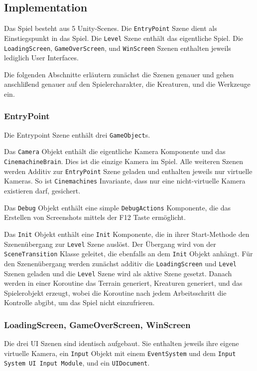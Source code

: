  
\subsection{Implementation}
\begin{sloppypar}
Das Spiel besteht aus 5 Unity-Scenes.
Die \texttt{Entry\-Point} Szene dient als Einstiegspunkt in das Spiel.
Die \texttt{Level} Szene enthält das eigentliche Spiel.
Die \texttt{Loading\-Screen}, \texttt{GameOver\-Screen}, und \texttt{Win\-Screen} Szenen enthalten jeweils lediglich User Interfaces.

Die folgenden Abschnitte erläutern zunächst die Szenen genauer und gehen anschlißend genauer auf den Spielercharakter, die Kreaturen, und die Werkzeuge ein.
\end{sloppypar}

\subsubsection{EntryPoint}
\begin{sloppypar}
Die Entrypoint Szene enthält drei \texttt{Game\-Object}s.

Das \texttt{Camera} Objekt enthält die eigentliche Kamera Komponente und das \texttt{Cinemachine\-Brain}.
Dies ist die einzige Kamera im Spiel.
Alle weiteren Szenen werden Additiv zur \texttt{Entry\-Point} Szene geladen und enthalten jeweils nur virtuelle Kameras.
So ist \texttt{Cinemachines} Invariante, dass nur eine nicht-virtuelle Kamera existieren darf, gesichert.

Das \texttt{Debug} Objekt enthält eine simple \texttt{Debug\-Actions} Komponente, die das Erstellen von Screenshots mittels der F12 Taste ermöglicht.

Das \texttt{Init} Objekt enthält eine \texttt{Init} Komponente, die in ihrer Start-Methode den Szenenübergang zur \texttt{Level} Szene auslöst.
Der Übergang wird von der \texttt{Scene\-Transition} Klasse geleitet, die ebenfalls an dem \texttt{Init} Objekt anhängt.
Für den Szenenübergang werden zunächst additiv die \texttt{Loading\-Screen} und \texttt{Level} Szenen geladen und die \texttt{Level} Szene wird als aktive Szene gesetzt.
Danach werden in einer Koroutine das Terrain generiert, Kreaturen generiert, und das Spielerobjekt erzeugt, wobei die Koroutine nach jedem Arbeitsschritt die Kontrolle abgibt, um das Spiel nicht einzufrieren.
\end{sloppypar}

\subsubsection{LoadingScreen, GameOverScreen, WinScreen}
Die drei UI Szenen sind identisch aufgebaut.
Sie enthalten jeweils ihre eigene virtuelle Kamera, ein \texttt{Input} Objekt mit einem \texttt{EventSystem} und dem \texttt{Input System UI Input Module}, und ein \texttt{UIDocument}.

